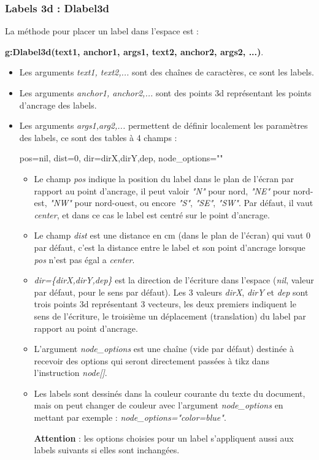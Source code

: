 \documentclass[%
10pt,%
a4paper,%
french,%
]%
{article}%
\begin{document}
\subsubsection{Labels 3d : Dlabel3d}

La méthode pour placer un label dans l'espace est :

\hfil\textbf{g:Dlabel3d(text1, anchor1, args1, text2, anchor2, args2, ...)}.\hfil

    \begin{itemize}
    \item  Les arguments \emph{text1, text2,...} sont des chaînes de caractères, ce sont les labels.
    \item  Les arguments \emph{anchor1, anchor2,...} sont des points 3d représentant les points d'ancrage des labels.
    \item  Les arguments \emph{args1,arg2,...}  permettent de définir localement les paramètres des labels, ce sont des tables à 4 champs :
\begin{TeXcode}
    { pos=nil, dist=0, dir={dirX,dirY,dep}, node_options="" }
\end{TeXcode}
        \begin{itemize}
            \item Le champ \emph{pos} indique la position du label dans le plan de l'écran par rapport au point d'ancrage, il peut valoir \emph{"N"} pour nord, \emph{"NE"} pour nord-est, \emph{"NW"} pour nord-ouest, ou encore \emph{"S"}, \emph{"SE"}, \emph{"SW"}. Par défaut, il vaut \emph{center}, et dans ce cas le label est centré sur le point  d'ancrage.
            \item Le champ \emph{dist} est une distance en cm (dans le plan de l'écran) qui vaut $0$ par défaut, c'est la distance entre le label et son point d'ancrage lorsque \emph{pos} n'est pas égal a \emph{center}.
            \item \emph{dir=\{dirX,dirY,dep\}} est la direction de l'écriture dans l'espace (\emph{nil}, valeur par défaut, pour le sens par défaut). Les 3 valeurs \emph{dirX}, \emph{dirY} et \emph{dep} sont trois points 3d représentant 3 vecteurs, les deux premiers indiquent le sens de l'écriture, le troisième un déplacement (translation) du label par rapport au point d'ancrage.
            \item L'argument \emph{node\_options} est une chaîne (vide par défaut) destinée à recevoir des options qui seront directement passées à tikz dans l'instruction \emph{node{[}{]}}.
            \item Les labels sont dessinés dans la couleur courante du texte du document, mais on peut changer de couleur avec l'argument \emph{node\_options} en mettant par exemple : \emph{node\_options="color=blue"}.
            
            \textbf{Attention} : les options choisies pour un label s'appliquent aussi aux labels suivants si elles sont inchangées.
        \end{itemize}
  \end{itemize}
\end{document}
